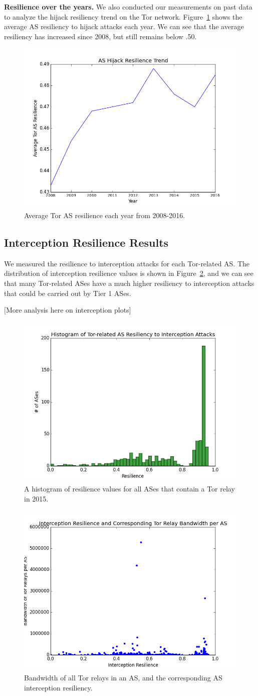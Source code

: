 {\bf Resilience over the years.} We also conducted our measurements on past data to analyze the hijack resiliency trend on the Tor network.  Figure~\ref{fig:resilience_trend} shows the average AS resiliency to hijack attacks each year.  We can see that the average resiliency has increased since 2008, but still remains below .50.  

\begin{figure}[ht!]
\centering
\includegraphics[width=.4\textwidth]{hijack_resilience_trend}
\caption{Average Tor AS resilience each year from 2008-2016.}
\label{fig:resilience_trend}
\end{figure}

\subsection{Interception Resilience Results}

We measured the resilience to interception attacks for each Tor-related AS.  The distribution of interception resilience values is shown in Figure~\ref{fig:interception_histogram}, and we can see that many Tor-related ASes have a much higher resiliency to interception attacks that could be carried out by Tier 1 ASes.  

[More analysis here on interception plots]

\begin{figure}
\centering
\includegraphics[width=.4\textwidth]{interception_resiliency}
\caption{A histogram of resilience values for all ASes that contain a Tor relay in 2015.}
\label{fig:interception_histogram}
\end{figure}

\begin{figure}
\centering
\includegraphics[width=.4\textwidth]{interception_bandwidth}
\caption{Bandwidth of all Tor relays in an AS, and the corresponding AS interception resiliency.}
\label{fig:interception_bw}
\end{figure}

